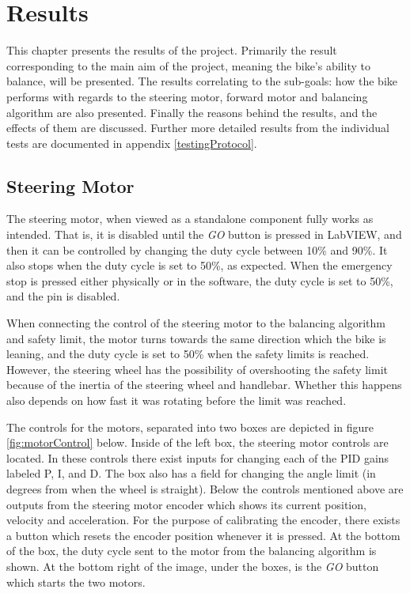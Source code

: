 \chapter{Results}\label{results}

This chapter presents the results of the project. Primarily the result corresponding to the main aim of the project, meaning the bike's ability to balance, will be presented. The results correlating to the sub-goals: how the bike performs with regards to the steering motor, forward motor and balancing algorithm are also presented. Finally the reasons behind the results, and the effects of them are discussed. Further more detailed results from the individual tests are documented in appendix \ref{testingProtocol}.

\section{Steering Motor}

The steering motor, when viewed as a standalone component fully works as intended. That is, it is disabled until the \textit{GO} button is pressed in LabVIEW, and then it can be controlled by changing the duty cycle between 10\% and 90\%. It also stops when the duty cycle is set to 50\%, as expected. When the emergency stop is pressed either physically or in the software, the duty cycle is set to 50\%, and the pin is disabled. 

When connecting the control of the steering motor to the balancing algorithm and safety limit, the motor turns towards the same direction which the bike is leaning, and the duty cycle is set to 50\% when the safety limits is reached. However, the steering wheel has the possibility of overshooting the safety limit because of the inertia of the steering wheel and handlebar. Whether this happens also depends on how fast it was rotating before the limit was reached.

The controls for the motors, separated into two boxes are depicted in figure \ref{fig:motorControl} below. Inside of the left box, the steering motor controls are located. In these controls there exist inputs for changing each of the PID gains labeled P, I, and D. The box also has a field for changing the angle limit (in degrees from when the wheel is straight). Below the controls mentioned above are outputs from the steering motor encoder which shows its current position, velocity and acceleration. For the purpose of calibrating the encoder, there exists a button which resets the encoder position whenever it is pressed. At the bottom of the box, the duty cycle sent to the motor from the balancing algorithm is shown. At the bottom right of the image, under the boxes, is the \textit{GO} button which starts the two motors.

